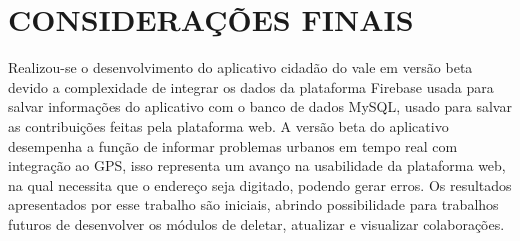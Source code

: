 
\chapter*{CONSIDERAÇÕES FINAIS}
\label{cap:Conclusao}
Realizou-se o desenvolvimento do aplicativo cidadão do vale em versão beta devido a complexidade de integrar os dados da plataforma Firebase usada para salvar informações do aplicativo com o banco de dados MySQL, usado para  salvar as contribuições feitas pela plataforma web.
A versão beta do aplicativo desempenha a função de informar problemas urbanos em tempo real com integração ao GPS, isso representa um avanço na usabilidade da plataforma web, na qual necessita que o endereço seja digitado, podendo gerar erros. 
Os resultados apresentados por esse trabalho são iniciais, abrindo possibilidade para trabalhos futuros de desenvolver os módulos de deletar, atualizar e visualizar colaborações.


